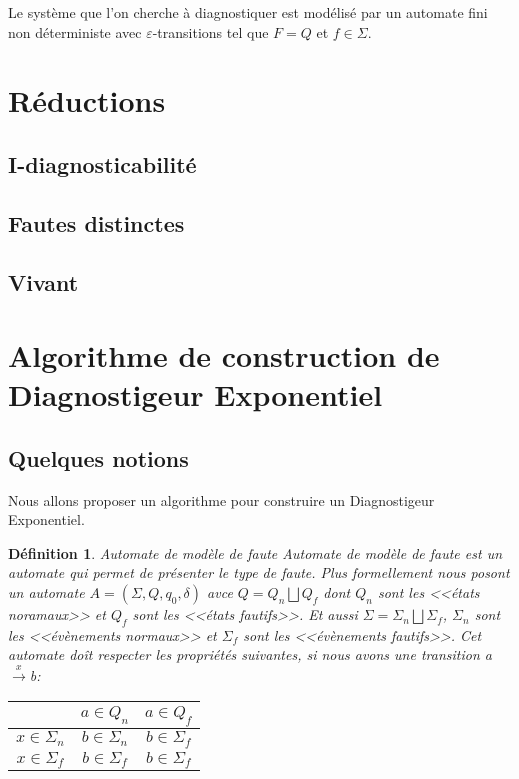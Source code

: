 \documentclass[10pt,a4paper]{article}
\newtheorem {mydef} {D\'efinition}
\begin{document}
Le système que l'on cherche à diagnostiquer est modélisé par un automate fini non d\'eterministe avec $\varepsilon$-transitions tel que $F=Q$ et $f\in \Sigma$.


\section{R\'eductions}

\subsection{I-diagnosticabilit\'e}

\subsection{Fautes distinctes}

\subsection{Vivant}


\section{Algorithme de construction de Diagnostigeur Exponentiel}
        \subsection{Quelques notions}
    Nous allons proposer un algorithme pour construire un Diagnostigeur Exponentiel.
    \begin{mydef}{Automate de mod\`ele de faute}
                Automate de mod\`ele de faute est un automate qui permet de pr\'esenter le type de faute. Plus formellement nous posont un automate $A = (\Sigma, Q,q_0,\delta)$ avce $Q = Q_n \bigsqcup Q_f$ dont $Q_n$ sont les <<\'etats noramaux>> et $Q_f$ sont les <<\'etats fautifs>>. Et aussi $\Sigma = \Sigma_n \bigsqcup \Sigma_f$, $\Sigma_n$ sont les <<\'ev\`enements normaux>> et $\Sigma_f$ sont les <<\'ev\`enements fautifs>>. Cet automate do\^it respecter les propri\'et\'es suivantes, si nous avons une transition a$\xrightarrow{x}$b:
                \begin{center}
                \begin{tabular}{|c|c|c|}
                        \hline
                        & $a\in Q_n$ & $a\in Q_f$\\
                        \hline                        
                        $x\in \Sigma_n$ & $b\in \Sigma_n$&$b\in \Sigma_f$\\
                        \hline                        
                        $x\in \Sigma_f$ &$b\in \Sigma_f$&$b\in \Sigma_f$\\
                        \hline
                \end{tabular}
                \end{center}
    \end{mydef}
    
\end{document}

